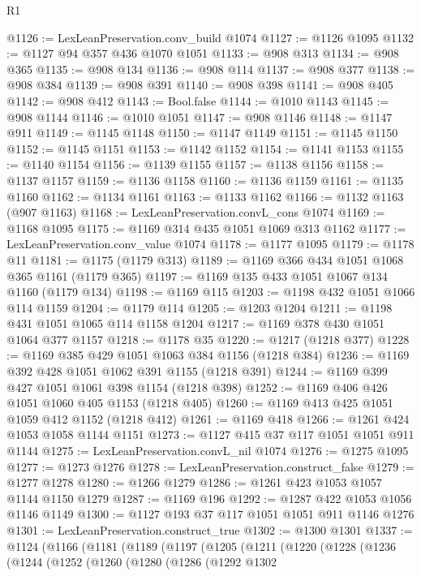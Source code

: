 \begin{lexlean}{R1}
\begin{coremodule}
@1126 := LexLeanPreservation.conv_build @1074
@1127 := @1126 @1095
@1132 := @1127 @94 @357 @436 @1070 @1051
@1133 := @908 @313
@1134 := @908 @365
@1135 := @908 @134
@1136 := @908 @114
@1137 := @908 @377
@1138 := @908 @384
@1139 := @908 @391
@1140 := @908 @398
@1141 := @908 @405
@1142 := @908 @412
@1143 := Bool.false
@1144 := @1010 @1143
@1145 := @908 @1144
@1146 := @1010 @1051
@1147 := @908 @1146
@1148 := @1147 @911
@1149 := @1145 @1148
@1150 := @1147 @1149
@1151 := @1145 @1150
@1152 := @1145 @1151
@1153 := @1142 @1152
@1154 := @1141 @1153
@1155 := @1140 @1154
@1156 := @1139 @1155
@1157 := @1138 @1156
@1158 := @1137 @1157
@1159 := @1136 @1158
@1160 := @1136 @1159
@1161 := @1135 @1160
@1162 := @1134 @1161
@1163 := @1133 @1162
@1166 := @1132 @1163 (@907 @1163)
@1168 := LexLeanPreservation.convL_cons @1074
@1169 := @1168 @1095
@1175 := @1169 @314 @435 @1051 @1069 @313 @1162
@1177 := LexLeanPreservation.conv_value @1074
@1178 := @1177 @1095
@1179 := @1178 @11
@1181 := @1175 (@1179 @313)
@1189 := @1169 @366 @434 @1051 @1068 @365 @1161 (@1179 @365)
@1197 := @1169 @135 @433 @1051 @1067 @134 @1160 (@1179 @134)
@1198 := @1169 @115
@1203 := @1198 @432 @1051 @1066 @114 @1159
@1204 := @1179 @114
@1205 := @1203 @1204
@1211 := @1198 @431 @1051 @1065 @114 @1158 @1204
@1217 := @1169 @378 @430 @1051 @1064 @377 @1157
@1218 := @1178 @35
@1220 := @1217 (@1218 @377)
@1228 := @1169 @385 @429 @1051 @1063 @384 @1156 (@1218 @384)
@1236 := @1169 @392 @428 @1051 @1062 @391 @1155 (@1218 @391)
@1244 := @1169 @399 @427 @1051 @1061 @398 @1154 (@1218 @398)
@1252 := @1169 @406 @426 @1051 @1060 @405 @1153 (@1218 @405)
@1260 := @1169 @413 @425 @1051 @1059 @412 @1152 (@1218 @412)
@1261 := @1169 @418
@1266 := @1261 @424 @1053 @1058 @1144 @1151
@1273 := @1127 @415 @37 @117 @1051 @1051 @911 @1144
@1275 := LexLeanPreservation.convL_nil @1074
@1276 := @1275 @1095
@1277 := @1273 @1276
@1278 := LexLeanPreservation.construct_false
@1279 := @1277 @1278
@1280 := @1266 @1279
@1286 := @1261 @423 @1053 @1057 @1144 @1150 @1279
@1287 := @1169 @196
@1292 := @1287 @422 @1053 @1056 @1146 @1149
@1300 := @1127 @193 @37 @117 @1051 @1051 @911 @1146 @1276
@1301 := LexLeanPreservation.construct_true
@1302 := @1300 @1301
@1337 := @1124
    (@1166
      (@1181
        (@1189
          (@1197
            (@1205
              (@1211
                (@1220
                  (@1228
                    (@1236
                      (@1244
                        (@1252
                          (@1260
                            (@1280
                              (@1286
                                (@1292
                                  @1302

\end{coremodule}
\end{lexlean}
